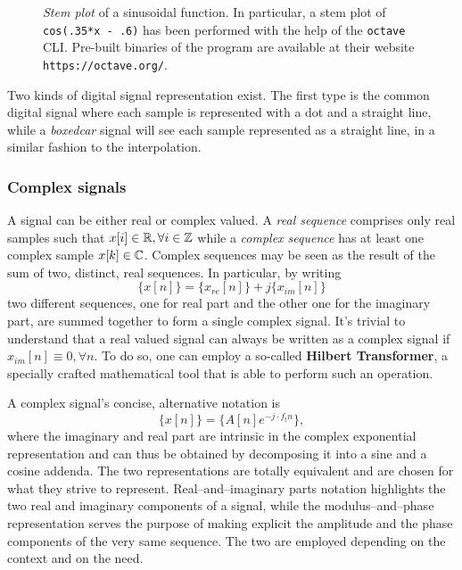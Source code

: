 \documentclass[\documentfontsize, twocolumn]{\classname}
\begin{document}
\begin{figure}[ht]
\begin{center}
\scalebox{0.6}{

}\caption{\emph{Stem plot} of a sinusoidal function. In particular, a stem plot of \texttt{cos(.35*x - .6)} has been performed with the help of the \texttt{octave} CLI. Pre-built binaries of the program are available at their website \texttt{https://octave.org/}.}\label{oct:stemPlot}
\end{center}
\end{figure}

Two kinds of digital signal representation exist. The first type is the common
digital signal where each sample is represented with a dot and a straight
line, while a \emph{boxedcar} signal will see each sample represented as a
straight line, in a similar fashion to the interpolation.

\subsubsection{Complex signals}

A signal can be either real or complex valued. A \emph{real se\-quen\-ce} comprises only real samples such that $x[i] \in \mathbb R, \forall i \in \mathbb Z$ while a \emph{complex se\-quen\-ce} has at least one complex sample $x[k] \in \mathbb C$. 
Complex se\-quen\-ces may be seen as the result of the sum of two, distinct, real se\-quen\-ces.
In particular, by writing \[\{x[n]\} = \{x_{re}[n]\} + j\{x_{im}[n]\}\] two different se\-quen\-ces, one for real part and the other one for the imaginary part, are summed together to form a single complex signal.
It's trivial to understand that a real valued signal can always be written as a complex signal if $x_{im}[n] \equiv 0, \forall n$. To do so, one can employ a so-called \textbf{Hilbert Transformer}, a specially crafted mathematical tool that is able to perform such an operation.

A complex signal's concise, alternative notation is \[\{x[n]\} = \{A[n]e^{-j\cdot f_t n}\},\] where the imaginary and real part are intrinsic in the complex exponential representation and can thus be obtained by decomposing it into a sine and a cosine addenda. The two representations are totally equivalent and are chosen for what they strive to represent. Real--and--imaginary parts notation highlights the two real and imaginary components of a signal, while the modulus--and--phase representation serves the purpose of making explicit the amplitude and the phase components of the very same sequence. The two are employed depending on the context and on the need.
\end{document}

